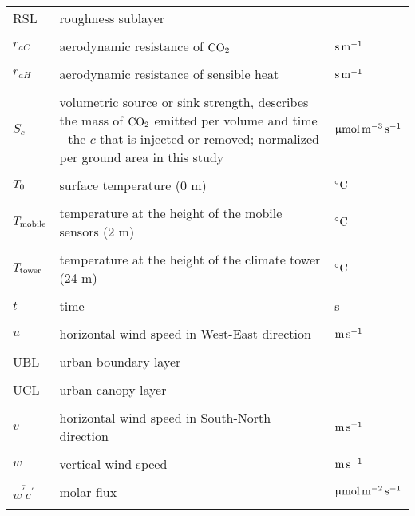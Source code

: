 \begin{longtable}{L{3cm}L{6cm}L{3cm}}
RSL & roughness sublayer& \\\\

$r_{aC}$	&  aerodynamic resistance of $\rm{CO}_2$ 	& $\rm{s} \, \rm{m}^{-1}$ \\\\

$r_{aH}$	&  aerodynamic resistance of sensible heat 	& $\rm{s} \, \rm{m}^{-1}$ \\\\

$S_c$	&	volumetric source or sink strength, describes the mass of $\rm{CO}_2$ emitted per volume and time - the $c$ that is injected or removed; normalized per ground area in this study 	&	$\upmu\rm{mol\, m^{-3}\, s^{-1}}$ \\\\

$T_{\rm{0}}$	&  surface temperature (0 m) 	& $^{\circ} \rm{C}$ \\\\

$T_{\rm{mobile}}$ &  temperature at the height of the mobile sensors (2 m) & $^{\circ} \rm{C}$ \\\\

$T_{\rm{tower}}$	&  temperature at the height of the climate tower (24 m) 	& $^{\circ}\rm{C}$ \\\\

$t$			& 	time	&  s\\\\

$u$			& 	horizontal wind speed in West-East direction & $\rm{m}\,\rm{s}^{-1}$ \\\\

UBL & urban boundary layer & \\\\

UCL & urban canopy layer & \\\\

$v$ 	& horizontal wind speed in South-North direction & $\rm{m}\,\rm{s}^{-1}$ \\\\

$w$ 	& vertical wind speed & $\rm{m}\,\rm{s}^{-1}$ \\\\

$\overline{w^{\prime}c^{\prime}}$ 	&	 molar flux 	& 	$\upmu \rm{mol}\,\rm{m}^{-2}\,\rm{s}^{-1}$\\\\


\end{longtable}
